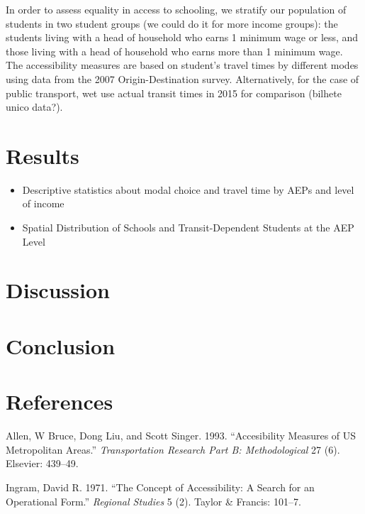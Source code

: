 \documentclass[]{article}
\begin{document}
In order to assess equality in access to schooling, we stratify our
population of students in two student groups (we could do it for more
income groups): the students living with a head of household who earns 1
minimum wage or less, and those living with a head of household who
earns more than 1 minimum wage. The accessibility measures are based on
student's travel times by different modes using data from the 2007
Origin-Destination survey. Alternatively, for the case of public
transport, wet use actual transit times in 2015 for comparison (bilhete
unico data?).

\section{Results}\label{results}

\begin{itemize}
\itemsep1pt\parskip0pt
\item
  Descriptive statistics about modal choice and travel time by AEPs and
  level of income
\item
  Spatial Distribution of Schools and Transit-Dependent Students at the
  AEP Level
\end{itemize}

\section{Discussion}\label{discussion}

\section{Conclusion}\label{conclusion}

\section{References}\label{references}

Allen, W Bruce, Dong Liu, and Scott Singer. 1993. ``Accesibility
Measures of US Metropolitan Areas.'' \emph{Transportation Research Part
B: Methodological} 27 (6). Elsevier: 439--49.

Ingram, David R. 1971. ``The Concept of Accessibility: A Search for an
Operational Form.'' \emph{Regional Studies} 5 (2). Taylor \& Francis:
101--7.
\end{document}
